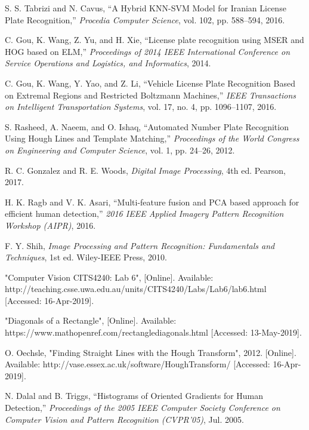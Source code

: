 \begin{thebibliography}{7}

{S. S. Tabrizi and N. Cavus, “A Hybrid KNN-SVM Model for Iranian License Plate Recognition,” \emph{Procedia Computer Science}, vol. 102, pp. 588–594, 2016.}

{C. Gou, K. Wang, Z. Yu, and H. Xie, “License plate recognition using MSER and HOG based on ELM,” \emph{Proceedings of 2014 IEEE International Conference on Service Operations and Logistics, and Informatics}, 2014.}

{C. Gou, K. Wang, Y. Yao, and Z. Li, “Vehicle License Plate Recognition Based on Extremal Regions and Restricted Boltzmann Machines,” \emph{IEEE Transactions on Intelligent Transportation Systems}, vol. 17, no. 4, pp. 1096–1107, 2016.}

{S. Rasheed, A. Naeem, and O. Ishaq, “Automated Number Plate Recognition Using Hough Lines and Template Matching,” \emph{Proceedings of the World Congress on Engineering and Computer Science}, vol. 1, pp. 24–26, 2012.}

{R. C. Gonzalez and R. E. Woods, \emph{Digital Image Processing}, 4th ed. Pearson, 2017.}

{H. K. Ragb and V. K. Asari, “Multi-feature fusion and PCA based approach for efficient human detection,” \emph{2016 IEEE Applied Imagery Pattern Recognition Workshop (AIPR)}, 2016.}

{F. Y. Shih, \emph{Image Processing and Pattern Recognition: Fundamentals and Techniques}, 1st ed. Wiley-IEEE Press, 2010.}

{"Computer Vision CITS4240: Lab 6", [Online]. Available: http://teaching.csse.uwa.edu.au/units/CITS4240/Labs/Lab6/lab6.html [Accessed: 16-Apr-2019].}

{"Diagonals of a Rectangle", [Online]. Available: https://www.mathopenref.com/rectanglediagonals.html [Accessed: 13-May-2019].}

{O. Oechsle, "Finding Straight Lines with the Hough Transform", 2012. [Online]. Available: http://vase.essex.ac.uk/software/HoughTransform/ [Accessed: 16-Apr-2019].}

{N. Dalal and B. Triggs, “Histograms of Oriented Gradients for Human Detection,” \emph{Proceedings of the 2005 IEEE Computer Society Conference on Computer Vision and Pattern Recognition (CVPR’05)}, Jul. 2005.}


\end{thebibliography}
